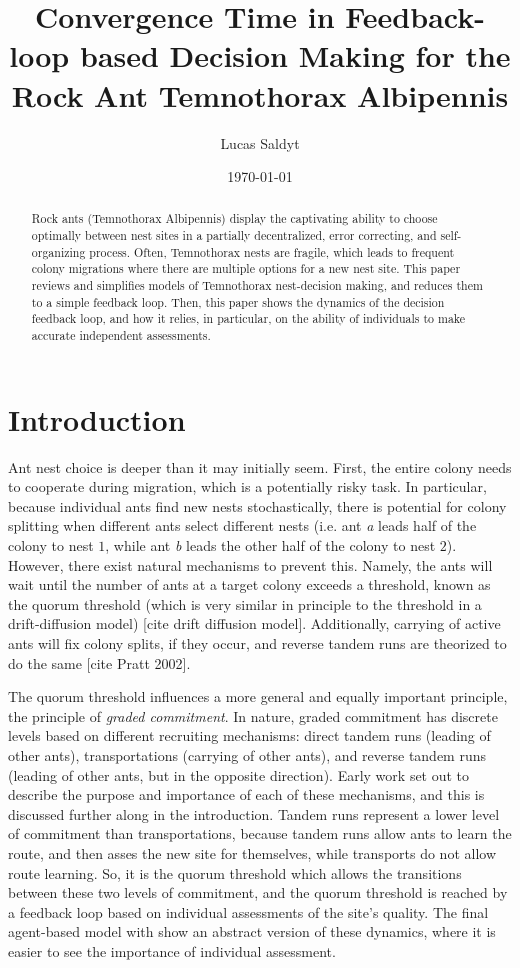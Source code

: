 \documentclass{article}
\title{Convergence Time in Feedback-loop based Decision Making for the Rock Ant Temnothorax Albipennis}
\date{\today}
\author{Lucas Saldyt}
\begin{document}
\maketitle

\begin{abstract}
    Rock ants (Temnothorax Albipennis) display the captivating ability to choose optimally between nest sites in a partially decentralized, error correcting, and self-organizing process.
    Often, Temnothorax nests are fragile, which leads to frequent colony migrations where there are multiple options for a new nest site.
    This paper reviews and simplifies models of Temnothorax nest-decision making, and reduces them to a simple feedback loop.
    Then, this paper shows the dynamics of the decision feedback loop, and how it relies, in particular, on the ability of individuals to make accurate independent assessments.
\end{abstract}

\section{Introduction}


Ant nest choice is deeper than it may initially seem.
First, the entire colony needs to cooperate during migration, which is a potentially risky task.
In particular, because individual ants find new nests stochastically, there is potential for colony splitting when different ants select different nests (i.e. ant \emph{a} leads half of the colony to nest $1$, while ant \emph{b} leads the other half of the colony to nest $2$).
However, there exist natural mechanisms to prevent this.
Namely, the ants will wait until the number of ants at a target colony exceeds a threshold, known as the quorum threshold (which is very similar in principle to the threshold in a drift-diffusion model) [cite drift diffusion model].
Additionally, carrying of active ants will fix colony splits, if they occur, and reverse tandem runs are theorized to do the same [cite Pratt 2002]. 

The quorum threshold influences a more general and equally important principle, the principle of \emph{graded commitment}.
In nature, graded commitment has discrete levels based on different recruiting mechanisms: direct tandem runs (leading of other ants), transportations (carrying of other ants), and reverse tandem runs (leading of other ants, but in the opposite direction). 
Early work set out to describe the purpose and importance of each of these mechanisms, and this is discussed further along in the introduction.
Tandem runs represent a lower level of commitment than transportations, because tandem runs allow ants to learn the route, and then asses the new site for themselves, while transports do not allow route learning.
So, it is the quorum threshold which allows the transitions between these two levels of commitment, and the quorum threshold is reached by a feedback loop based on individual assessments of the site's quality. The final agent-based model with show an abstract version of these dynamics, where it is easier to see the importance of individual assessment.
\end{document}
